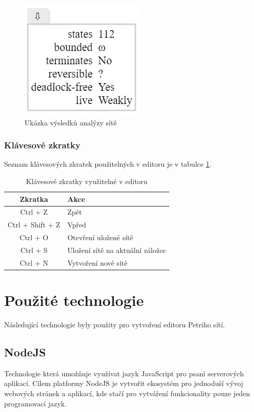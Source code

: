 \documentclass[
  biblatex,
  glossaries,
  printversion
]{kidiplom}
\begin{document}
\clearpage

\begin{figure}[h]
  \centering
  \includegraphics{analysis}
  \caption{Ukázka výsledků analýzy sítě}\label{analýza obrázek}
\end{figure}

\subsubsection{Klávesové zkratky}\label{zkratky}

Seznam klávesových zkratek použitelných v editoru je v tabulce \ref{tabulka zkratky}.
\begin{table}[h!]
  \centering
  \begin{tabular}{| c | l |}
    \hline
    Zkratka & Akce \\
    \hline
    Ctrl + Z      & Zpět \\
    Ctrl + Shift + Z & Vpřed \\
    Ctrl + O & Otevření uložené sítě \\
    Ctrl + S & Uložení sítě na aktuální záložce\\
    Ctrl + N & Vytvoření nové sítě \\
    \hline
  \end{tabular}
  \caption{Klávesové zkratky využitelné v editoru}\label{tabulka zkratky}
\end{table}




\section{Použité technologie}

Následující technologie byly použity pro vytvoření editoru Petriho sítí.


\subsection{NodeJS}
Technologie která umožňuje využívat jazyk JavaScript pro psaní 
serverových aplikací. Cílem platformy NodeJS je vytvořit
ekosystém pro jednoduší vývoj webových stránek a aplikací, 
kde stačí pro vytváření funkcionality pouze jeden programovací jazyk.
\end{document}
